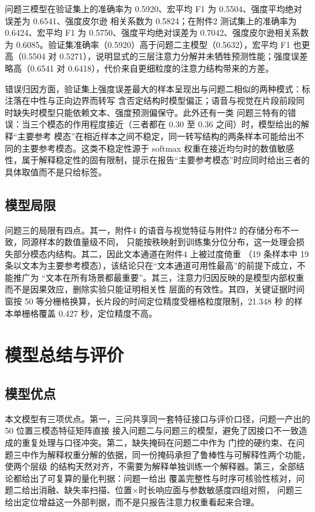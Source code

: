 \documentclass[bwprint]{gmcmthesis}
\begin{document}
问题三模型在验证集上的准确率为 0.5920、宏平均 F1 为 0.5504、强度平均绝对误差为 0.6541、强度皮尔逊
相关系数为 0.5824；在附件2 测试集上的准确率为 0.6424、宏平均 F1 为 0.5750、强度平均绝对误差为
0.7042、强度皮尔逊相关系数为 0.6085。验证集准确率（0.5920）高于问题二主模型（0.5632），宏平均 F1
也更高（0.5504 对 0.5271），说明显式的三层注意力分解并未牺牲预测性能；强度误差略高（0.6541 对
0.6418），代价来自更细粒度的注意力结构带来的方差。

错误归因方面，验证集上强度误差最大的样本呈现出与问题二相似的两种模式：标注落在中性与正向边界而转写
含否定结构时模型偏正；语音与视觉在片段前段同时缺失时模型只能依赖文本、强度预测偏保守。此外还有一类
问题三特有的错误：当三个模态的作用程度接近（三者都在 0.30 至 0.36 之间）时，模型给出的解释“主要参考
模态”在相近样本之间不稳定，同一转写结构的两条样本可能给出不同的主要参考模态。这类不稳定性源于 softmax
权重在接近均匀时的数值敏感性，属于解释稳定性的固有限制，提示在报告“主要参考模态”时应同时给出三者的
具体取值而不是只给标签。

\subsection{模型局限}

问题三的局限有四点。其一，附件4 的语音与视觉特征与附件2 的存储分布不一致，同源样本的数值量级不同，
只能按秩映射到训练集分位分布，这一处理会损失部分模态内结构。其二，因此文本通道在附件4 上被过度倚重
（19 条样本中 19 条以文本为主要参考模态），该结论只在“文本通道可用性最高”的前提下成立，不能推广为
“文本在所有场景都最重要”。其三，注意力归因反映的是模型内部权重而不是因果效应，删除实验只能证明相关性
层面的有效性。其四，关键证据时间窗按 50 等分栅格换算，长片段的时间定位精度受栅格粒度限制，21.348 秒
的样本单栅格覆盖 0.427 秒，定位精度不高。

\section{模型总结与评价}

\subsection{模型优点}

本文模型有三项优点。第一，三问共享同一套特征接口与评价口径，问题一产出的 50 位置三模态特征矩阵直接
接入问题二与问题三的模型，避免了因接口不一致造成的重复处理与口径冲突。第二，缺失掩码在问题二中作为
门控的硬约束、在问题三中作为解释权重分解的依据，同一份掩码承担了鲁棒性与可解释性两个功能，使两个层级
的结构天然对齐，不需要为解释单独训练一个解释器。第三，全部结论都给出了可复算的量化判据：问题一给出
覆盖完整性与时序可核验性核对，问题二给出消融、缺失率扫描、位置×时长响应面与参数敏感度四组对照，
问题三给出定位增益这一外部判据，而不是只报告注意力权重看起来合理。
\end{document}
